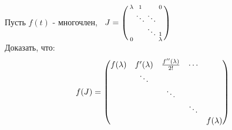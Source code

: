     \begin{exercise}
        Пусть $f(t)$ - многочлен, \ $J = \left(\begin{smallmatrix}
            \lambda & 1 & \null & 0\\
            \null & \ddots & \ddots\\
            \null & \null & \ddots & 1 \\
            0 & \null & \null & \lambda
        \end{smallmatrix}
        \right)$\\
        Доказать, что:
        $$f(J) = \begin{pmatrix}
            f(\lambda) & f'(\lambda) & \frac{f''(\lambda)}{2!} & \cdots\\
            \null & \ddots \\
            \null & \null & \ddots\\
            \null & \null & \null & \ddots\\
            \null & \null & \null & \null & f(\lambda)
        \end{pmatrix}$$  
    \end{exercise}
